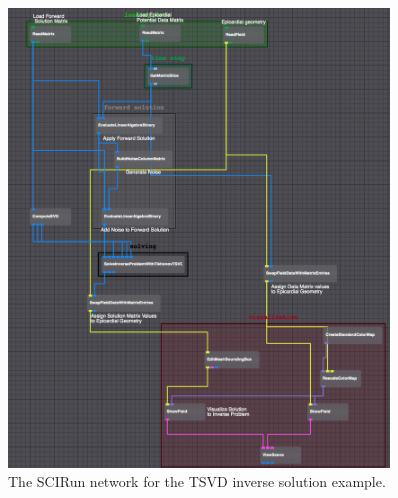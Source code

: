     \begin{figure}
        \begin{center}
        \includegraphics[width=0.9\textwidth]{ECGToolkitGuide_figures/TSVDNetwork.png}
        \caption{The SCIRun network for the TSVD inverse solution example.}
        \label{fig:TSVDNetworkExample}
        \end{center}
    \end{figure}




    
    
   

